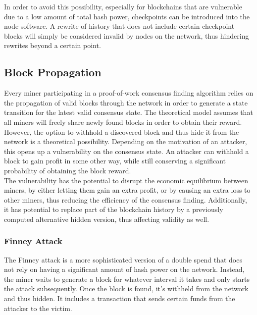 \documentclass[12pt,a4paper]{article}
\begin{document}
In order to avoid this possibility, especially for blockchains that are vulnerable due to a low amount of total hash power, checkpoints can be introduced into the node software. A rewrite of history that does not include certain checkpoint blocks will simply be considered invalid by nodes on the network, thus hindering rewrites beyond a certain point.\\

\subsection{Block Propagation}

Every miner participating in a proof-of-work consensus finding algorithm relies on the propagation of valid blocks through the network in order to generate a state transition for the latest valid consensus state. The theoretical model assumes that all miners will freely share newly found blocks in order to obtain their reward.\\

However, the option to withhold a discovered block and thus hide it from the network is a theoretical possibility. Depending on the motivation of an attacker, this opens up a vulnerability on the consensus state. An attacker can withhold a block to gain profit in some other way, while still conserving a significant probability of obtaining the block reward.\\

The vulnerability has the potential to disrupt the economic equilibrium between miners, by either letting them gain an extra profit, or by causing an extra loss to other miners, thus reducing the efficiency of the consensus finding. Additionally, it has potential to replace part of the blockchain history by a previously computed alternative hidden version, thus affecting validity as well.\\

\subsubsection{Finney Attack}

The Finney attack is a more sophisticated version of a double spend that does not rely on having a significant amount of hash power on the network. Instead, the miner waits to generate a block for whatever interval it takes and only starts the attack subsequently. Once the block is found, it's withheld from the network and thus hidden. It includes a transaction that sends certain funds from the attacker to the victim.\\
\end{document}
